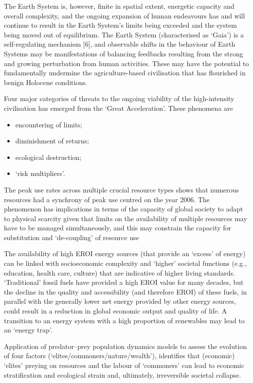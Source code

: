 \documentclass[
]{book}
\providecommand{\tightlist}{%
  \setlength{\itemsep}{0pt}\setlength{\parskip}{0pt}}
\begin{document}
The Earth System is, however, finite in spatial extent, energetic capacity and overall
complexity, and the ongoing expansion of human endeavours has and will continue to
result in the Earth System's limits being exceeded and the system being moved out of
equilibrium. The Earth System (characterised as `Gaia') is a self-regulating mechanism {[}6{]},
and observable shifts in the behaviour of Earth Systems may be manifestations of balancing
feedbacks resulting from the strong and growing perturbation from human activities. These
may have the potential to fundamentally undermine the agriculture-based civilisation that
has flourished in benign Holocene conditions.

Four major categories of threats to the ongoing
viability of the high-intensity civilisation has emerged from the `Great Acceleration'.
These phenomena are

\begin{itemize}
\tightlist
\item
  encountering of limits;
\item
  diminishment of returns;
\item
  ecological destruction;
\item
  `risk multipliers'.
\end{itemize}

The peak use rates across multiple crucial resource types shows that
numerous resources had a synchrony of peak use centred on the year 2006. The
phenomenon has implications in terms of the capacity of global society to adapt to physical
scarcity given that limits on the availability of multiple resources may have to be managed
simultaneously, and this may constrain the capacity for substitution and `de-coupling' of
resource use

The availability of high EROI energy
sources (that provide an `excess' of energy) can be linked with socioeconomic complexity
and `higher' societal functions (e.g., education, health care, culture) that are indicative of
higher living standards. `Traditional' fossil fuels have provided a high EROI value for many
decades, but the decline in the quality and accessibility (and therefore EROI) of these fuels,
in parallel with the generally lower net energy provided by other energy sources, could
result in a reduction in global economic output and quality of life.
A transition to an energy system with a high
proportion of renewables may lead to an `energy trap'.

Application of predator--prey population dynamics models to assess
the evolution of four factors (`elites/commoners/nature/wealth'),
identifies that (economic) `elites' preying on resources and the labour of `commoners' can
lead to economic stratification and ecological strain and, ultimately, irreversible societal
collapse.
\end{document}
